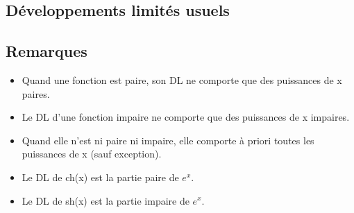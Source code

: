 \documentclass[french]{yLectureNote}
\begin{document}
\subsection{Développements limités usuels}

\subsection{Remarques}
\begin{itemize}
 \item Quand une fonction est paire, son DL ne comporte que des puissances de x paires.
\item Le DL d’une fonction impaire ne comporte que des puissances de x impaires.
\item Quand elle n’est ni paire ni impaire, elle comporte à priori toutes les puissances de x (sauf exception).
\item Le DL de ch(x) est la partie paire de $e^x$.
\item Le DL de sh(x) est la partie impaire de $e^x$.
\end{itemize}
\end{document}
